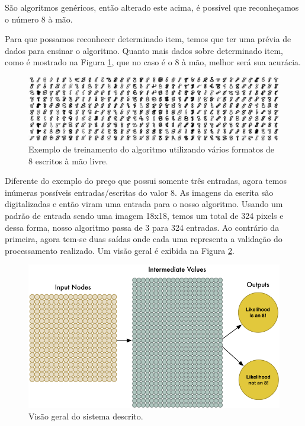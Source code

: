 \documentclass[10pt, conference]{IEEEtran}
\begin{document}
		São algoritmos genéricos, então alterado este acima, é possível que reconheçamos o número 8 à mão.

		Para que possamos reconhecer determinado item, temos que ter uma prévia de dados para ensinar o algoritmo. Quanto mais dados sobre determinado item, como é mostrado na Figura \ref{fig:entrada_padrao_8}, que no caso é o 8 à mão, melhor será sua acurácia.

		\begin{figure}[t]
			\centering
			\includegraphics[width=1.0\linewidth]{img/entrada_padrao_8.jpeg}
			\caption{Exemplo de treinamento do algoritmo utilizando vários formatos de 8 escritos à mão livre.}
			\label{fig:entrada_padrao_8}
		\end{figure}

		Diferente do exemplo do preço que possui somente três entradas, agora temos inúmeras possíveis entradas/escritas do valor 8. As imagens da escrita são digitalizadas e então viram uma entrada para o nosso algoritmo. Usando um padrão de entrada sendo uma imagem 18x18, temos um total de 324 pixels e dessa forma, nosso algoritmo passa de 3 para 324 entradas. Ao contrário da primeira, agora tem-se duas saídas onde cada uma representa a validação do processamento realizado. Um visão geral é exibida na Figura \ref{fig:visao_geral_8}.

		\begin{figure}[H]
			\centering
			\includegraphics[width=1.0\linewidth]{img/visao_gera_8.png}
			\caption{Visão geral do sistema descrito.}
			\label{fig:visao_geral_8}
		\end{figure}
\end{document}
